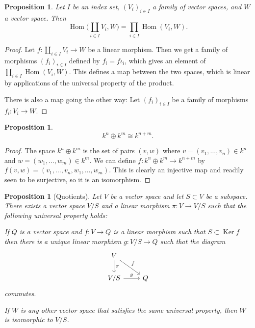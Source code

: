 \documentclass[11pt]{article}
\newtheorem{prop}[theo]{Proposition}
\theoremstyle{definition}
\DeclareMathOperator{\Hom}{Hom}
\DeclareMathOperator{\Ker}{Ker}
\begin{document}
\begin{prop}
Let $I$ be an index set, $(V_i)_{i\in I}$ a family of vector spaces, and $W$ a vector space.
Then
\[
\Hom\biggl(\coprod_{i\in I} V_i, W\biggr)
= \prod_{i\in I} \Hom(V_i, W).
\]
\end{prop}

\begin{proof}
Let $f : \coprod_{i\in I} V_i \to W$ be a linear morphism.
Then we get a family of morphisms $(f_i)_{i \in I}$ defined by $f_i = f \iota_i$, which gives an element of $\prod_{i\in I} \Hom(V_i, W)$.
This defines a map between the two spaces, which is linear by applications of the universal property of the product.

There is also a map going the other way:
Let $(f_i)_{i \in I}$ be a family of morphisms $f_i : V_i \to W$.
\end{proof}









\begin{prop}
\[
k^n \oplus k^m \cong k^{n+m}.
\]
\end{prop}

\begin{proof}
The space $k^n \oplus k^m$ is the set of pairs $(v,w)$ where $v = (v_1, \ldots, v_n) \in k^n$ and $w = (w_1, \ldots, w_m) \in k^m$.
We can define $f : k^n \oplus k^m \to k^{n+m}$ by $f(v,w) = (v_1, \ldots, v_n, w_1, \ldots, w_m)$.
This is clearly an injective map and readily seen to be surjective, so it is an isomorphism.
\end{proof}



\begin{prop}[Quotients]
\label{prop:quotient}
Let $V$ be a vector space and let $S \subset V$ be a subspace.
There exists a vector space $V/S$ and a linear morphism $\pi : V \to V/S$ such that the following universal property holds:

If $Q$ is a vector space and $f : V \to Q$ is a linear morphism such that $S \subset \Ker f$ then there is a unique linear morphism $g : V/S \to Q$ such that the diagram
\[
\begin{tikzcd}
V \ar[d,"\pi"] \ar[dr,"f"] &
\\
V/S \ar[r,"g"] & Q
\end{tikzcd}
\]
commutes.

If $W$ is any other vector space that satisfies the same universal property, then $W$ is isomorphic to $V/S$.
\end{prop}
\end{document}
